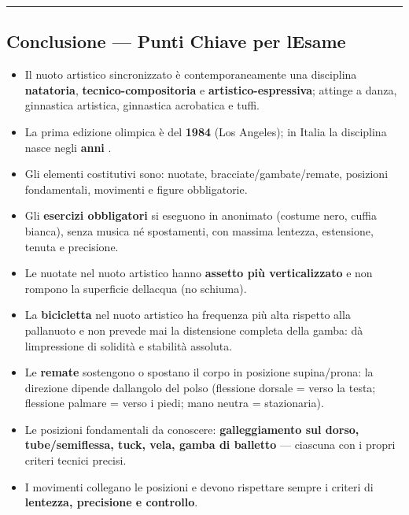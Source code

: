 \documentclass[a4paper,11pt]{article}
\providecommand{\tightlist}{%
  \setlength{\itemsep}{0pt}\setlength{\parskip}{0pt}}
\begin{document}
\begin{center}\rule{0.5\linewidth}{0.5pt}\end{center}

\subsection{Conclusione --- Punti Chiave per
      l\textquotesingle Esame}\label{conclusione-punti-chiave-per-lesame-11}

\begin{itemize}
      \tightlist
      \item
            Il nuoto artistico sincronizzato è contemporaneamente una disciplina
            \textbf{natatoria}, \textbf{tecnico-compositoria} e
            \textbf{artistico-espressiva}; attinge a danza, ginnastica artistica,
            ginnastica acrobatica e tuffi.
      \item
            La prima edizione olimpica è del \textbf{1984} (Los Angeles); in
            Italia la disciplina nasce negli \textbf{anni }.
      \item
            Gli elementi costitutivi sono: nuotate, bracciate/gambate/remate,
            posizioni fondamentali, movimenti e figure obbligatorie.
      \item
            Gli \textbf{esercizi obbligatori} si eseguono in anonimato (costume
            nero, cuffia bianca), senza musica né spostamenti, con massima
            lentezza, estensione, tenuta e precisione.
      \item
            Le nuotate nel nuoto artistico hanno \textbf{assetto più
                  verticalizzato} e non rompono la superficie dell\textquotesingle acqua
            (no schiuma).
      \item
            La \textbf{bicicletta} nel nuoto artistico ha frequenza più alta
            rispetto alla pallanuoto e non prevede mai la distensione completa
            della gamba: dà l\textquotesingle impressione di solidità e stabilità
            assoluta.
      \item
            Le \textbf{remate} sostengono o spostano il corpo in posizione
            supina/prona: la direzione dipende dall\textquotesingle angolo del
            polso (flessione dorsale = verso la testa; flessione palmare = verso i
            piedi; mano neutra = stazionaria).
      \item
            Le posizioni fondamentali da conoscere: \textbf{galleggiamento sul
                  dorso, tube/semiflessa, tuck, vela, gamba di balletto} --- ciascuna
            con i propri criteri tecnici precisi.
      \item
            I movimenti collegano le posizioni e devono rispettare sempre i
            criteri di \textbf{lentezza, precisione e controllo}.
\end{itemize}
\end{document}
